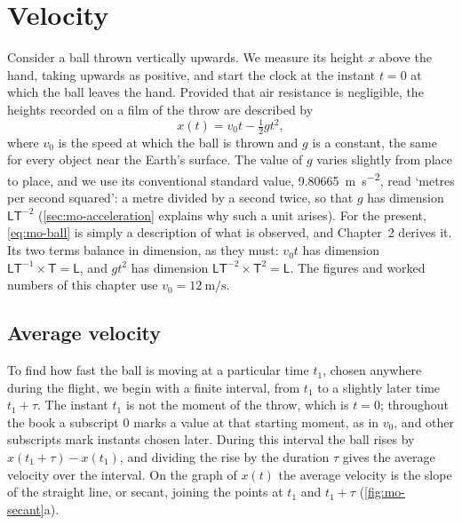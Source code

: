 \section{Velocity}
\label{sec:mo-velocity}

Consider a ball thrown vertically upwards. We measure its height $x$ above
the hand, taking upwards as positive, and start the clock at the instant
$t = 0$ at which the ball leaves the hand. Provided that air resistance is
negligible, the heights recorded on a film of the throw are described by
\begin{equation}
   x(t) = v_0 t - \tfrac12 g t^2,
   \label{eq:mo-ball}
\end{equation}
where $v_0$ is the speed at which the ball is thrown and $g$ is a constant,
the same for every object near the Earth's surface. The value of $g$
varies slightly from place to place, and we use its conventional standard
value, \SI{9.80665}{\metre\per\second\squared}, read `metres per second
squared': a metre divided by a second twice, so that $g$ has dimension
$\mathsf{L}\mathsf{T}^{-2}$ (\cref{sec:mo-acceleration} explains why
such a unit arises). For the present,
\cref{eq:mo-ball} is simply a description of what is observed, and
Chapter~2 derives it. Its two terms balance in dimension, as they must:
$v_0 t$ has dimension $\mathsf{L}\mathsf{T}^{-1}\times\mathsf{T} =
\mathsf{L}$, and $g t^2$ has dimension $\mathsf{L}\mathsf{T}^{-2}\times
\mathsf{T}^2 = \mathsf{L}$. The figures and worked numbers of this
chapter use $v_0 = \SI{12}{\metre\per\second}$.

\subsection*{Average velocity}

To find how fast the ball is moving at a particular time $t_1$, chosen
anywhere during the flight, we begin with a finite interval, from $t_1$ to
a slightly later time $t_1 + \tau$. The instant $t_1$ is not the moment of
the throw, which is $t = 0$; throughout the book a subscript 0 marks a
value at that starting moment, as in $v_0$, and other subscripts mark
instants chosen later.
During this interval the ball rises by $x(t_1+\tau) - x(t_1)$, and
dividing the rise by the duration $\tau$ gives the average velocity over
the interval. On the graph of $x(t)$ the average velocity is the slope of
the straight line, or secant, joining the points at $t_1$ and $t_1+\tau$
(\cref{fig:mo-secant}a).

